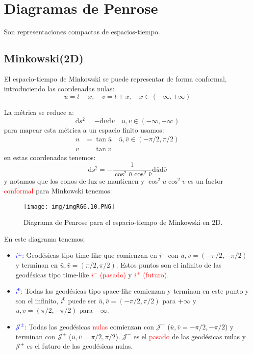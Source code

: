 \documentclass[../main]{subfiles}
\begin{document}
\section{Diagramas de Penrose}

Son representaciones compactas de espacios-tiempo.

\subsection{Minkowski(2D)}
El espacio-tiempo de Minkowski se puede representar de forma conformal, introduciendo las coordenadas nulas:
\begin{equation}
    u=t-x,\quad v=t+x,\quad x \in (-\infty, +\infty)
\end{equation}

La métrica se reduce a:
\begin{equation}
    \mathrm{d}s^2=-\mathrm{d}u\mathrm{d}v\quad u,v \in (-\infty, +\infty)
\end{equation}
para mapear esta métrica a un espacio finito usamos:
\begin{equation}
    \begin{split}
        u&=\tan \bar{u}\quad \bar{u}, \bar{v} \in (-\pi/2, \pi/2)\\
        v&=\tan \bar{v} 
    \end{split}
\end{equation}
en estas coordenadas tenemos:
\begin{equation}
    \mathrm{d}s^2=-\dfrac{1}{\cos^2 \bar{u} \cos^2 \bar{v}}\mathrm{d}\bar{u}\mathrm{d}\bar{v}
\end{equation}
y notamos que los conos de luz se mantienen y $\cos^2 \bar{u} \cos^2 \bar{v}$ es un factor \textcolor{red}{conformal} para Minkowski tenemos:
\begin{figure}[h]
    \centering
    \texttt{[image: img/imgRG6.10.PNG]}
    \caption{Diagrama de Penrose para el espacio-tiempo de Minkowski en 2D.}
\end{figure}

En este diagrama tenemos:
\begin{itemize}
    \item \textcolor{blue}{$i^{\pm}$:} Geodésicas tipo time-like que comienzan en $i^-$ con $\bar{u}, \bar{v}=(-\pi/2, -\pi/2)$ y terminan en $\bar{u}, \bar{v}=(\pi/2, \pi/2)$. Estos puntos son el infinito de las geodésicas tipo time-like \textcolor{red}{$i^-$ (pasado)} y \textcolor{red}{$i^+$ (futuro).}
    \item \textcolor{blue}{$i^{0}$:} Todas las geodésicas tipo space-like comienzan y terminan en este punto y son el infinito, $i^{0}$ puede ser $\bar{u}, \bar{v}=(-\pi/2, \pi/2)$ para $+\infty$ y $\bar{u}, \bar{v}=(\pi/2, -\pi/2)$ para $-\infty$.
    \item \textcolor{blue}{$\mathcal{J}^{\pm}$:} Todas las geodésicas \textcolor{red}{nulas} comienzan con $\mathcal{J}^-$ ($\bar{u}, \bar{v}=-\pi/2, -\pi/2$) y terminan con $\mathcal{J}^+$ ($\bar{u}, \bar{v}=\pi/2, \pi/2$). $\mathcal{J}^-$ es el \textcolor{red}{pasado} de las geodésicas nulas y $\mathcal{J}^+$ es el futuro de las geodésicas nulas.
\end{itemize}
\end{document}
